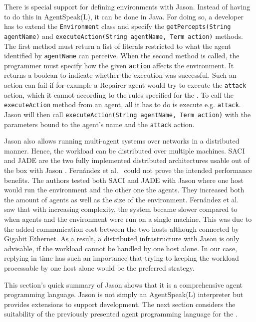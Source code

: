 There is special support for defining environments with Jason.
Instead of having to do this in AgentSpeak(L), it can be done in Java.
For doing so, a developer has to extend the \texttt{Environment} class and specify the \texttt{getPercepts(String agentName)} and \texttt{executeAction(String agentName, Term action)} methods.
The first method must return a list of literals restricted to what the agent identified by \texttt{agentName} can perceive.
When the second method is called, the programmer must specify how the given \texttt{action} affects the environment.
It returns a boolean to indicate whether the execution was successful.
Such an action can fail if for example a Repairer agent would try to execute the \texttt{attack} action, which it cannot according to the rules specified for the \mars{}.
To call the \texttt{executeAction} method from an agent, all it has to do is execute e.g. \texttt{attack}.
Jason will then call \texttt{executeAction(String agentName, Term action)} with the parameters bound to the agent's name and the \texttt{attack} action.

Jason also allows running multi-agent systems over networks in a distributed manner.
Hence, the workload can be distributed over multiple machines.
SACI~\cite{hubner_saci_2000} and JADE are the two fully implemented distributed architectures usable out of the box with Jason \cite{bordini_programming_2007}.
Fernández et al.~\cite{fernandez_evaluating_2010} could not prove the intended performance benefits.
The authors tested both SACI and JADE with Jason where one host would run the environment and the other one the agents.
They increased both the amount of agents as well as the size of the environment.
Fernández et al.~\cite{fernandez_evaluating_2010} saw that with increasing complexity, the system became slower compared to when agents and the environment were run on a single machine.
This was due to the added communication cost between the two hosts although connected by Gigabit Ethernet.
As a result, a distributed infrastructure with Jason is only advisable, if the workload cannot be handled by one host alone.
In our case, replying in time has such an importance that trying to keeping the workload processable by one host alone would be the preferred strategy.

This section's quick summary of Jason shows that it is a comprehensive agent programming language.
Jason is not simply an AgentSpeak(L) interpreter but provides extensions to support development.
The next section considers the suitability of the previously presented agent programming language for the \mars{}.
